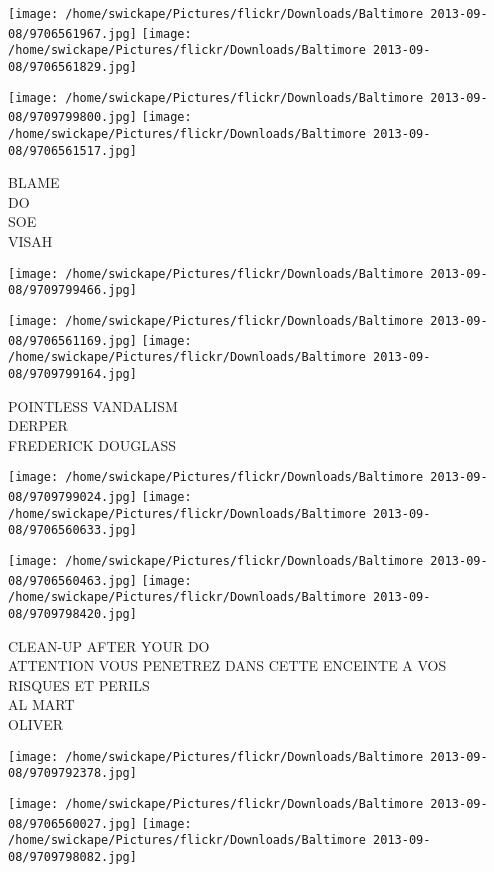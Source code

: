 \documentclass[10pt,letterpaper]{article}
\begin{document}
\texttt{[image: /home/swickape/Pictures/flickr/Downloads/Baltimore 2013-09-08/9706561967.jpg]}
\texttt{[image: /home/swickape/Pictures/flickr/Downloads/Baltimore 2013-09-08/9706561829.jpg]}

\texttt{[image: /home/swickape/Pictures/flickr/Downloads/Baltimore 2013-09-08/9709799800.jpg]}
\texttt{[image: /home/swickape/Pictures/flickr/Downloads/Baltimore 2013-09-08/9706561517.jpg]}

BLAME\\
DO\\
SOE\\
VISAH
\pagebreak

\texttt{[image: /home/swickape/Pictures/flickr/Downloads/Baltimore 2013-09-08/9709799466.jpg]}

\vspace{0.25in}
\texttt{[image: /home/swickape/Pictures/flickr/Downloads/Baltimore 2013-09-08/9706561169.jpg]}
\texttt{[image: /home/swickape/Pictures/flickr/Downloads/Baltimore 2013-09-08/9709799164.jpg]}

POINTLESS VANDALISM\\
DERPER\\
FREDERICK DOUGLASS
\pagebreak

\texttt{[image: /home/swickape/Pictures/flickr/Downloads/Baltimore 2013-09-08/9709799024.jpg]}
\texttt{[image: /home/swickape/Pictures/flickr/Downloads/Baltimore 2013-09-08/9706560633.jpg]}

\texttt{[image: /home/swickape/Pictures/flickr/Downloads/Baltimore 2013-09-08/9706560463.jpg]}
\texttt{[image: /home/swickape/Pictures/flickr/Downloads/Baltimore 2013-09-08/9709798420.jpg]}

CLEAN{-}UP AFTER YOUR DO\\
ATTENTION VOUS PENETREZ DANS CETTE ENCEINTE A VOS RISQUES ET PERILS\\
AL MART\\
OLIVER
\pagebreak

\texttt{[image: /home/swickape/Pictures/flickr/Downloads/Baltimore 2013-09-08/9709792378.jpg]}

\vspace{0.25in}
\texttt{[image: /home/swickape/Pictures/flickr/Downloads/Baltimore 2013-09-08/9706560027.jpg]}
\texttt{[image: /home/swickape/Pictures/flickr/Downloads/Baltimore 2013-09-08/9709798082.jpg]}
\end{document}
